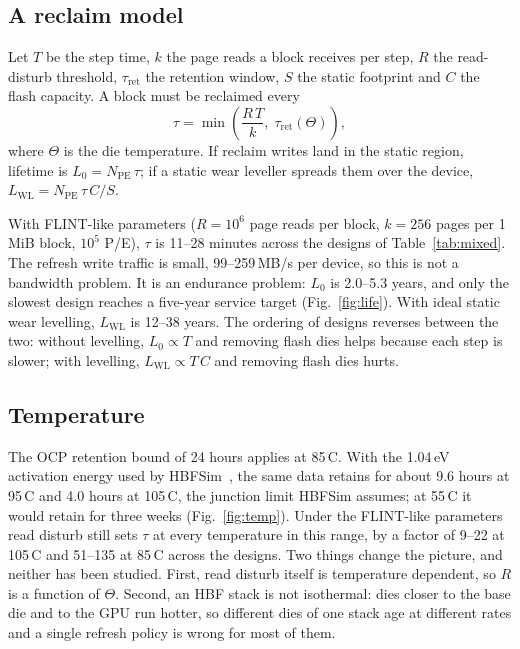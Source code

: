 \documentclass[conference,10pt]{IEEEtran}
\begin{document}
\subsection{A reclaim model}
Let $T$ be the step time, $k$ the page reads a block receives per step, $R$ the
read-disturb threshold, $\tau_{\mathrm{ret}}$ the retention window, $S$ the
static footprint and $C$ the flash capacity. A block must be reclaimed every
\begin{equation}
\tau = \min\!\left(\frac{R\,T}{k},\; \tau_{\mathrm{ret}}(\Theta)\right),
\label{eq:tau}
\end{equation}
where $\Theta$ is the die temperature. If reclaim writes land in the static
region, lifetime is $L_{0}=N_{\mathrm{PE}}\,\tau$; if a static wear leveller
spreads them over the device, $L_{\mathrm{WL}}=N_{\mathrm{PE}}\,\tau\,C/S$.

With FLINT-like parameters ($R=10^{6}$ page reads per block, $k=256$ pages per
1\,MiB block, $10^{5}$ P/E), $\tau$ is 11--28 minutes across the designs of
Table~\ref{tab:mixed}. The refresh write traffic is small, 99--259\,MB/s per
device, so this is not a bandwidth problem. It is an endurance problem:
$L_{0}$ is 2.0--5.3 years, and only the slowest design reaches a five-year
service target (Fig.~\ref{fig:life}). With ideal static wear levelling,
$L_{\mathrm{WL}}$ is 12--38 years. The ordering of designs reverses between the
two: without levelling, $L_{0}\propto T$ and removing flash dies helps because
each step is slower; with levelling, $L_{\mathrm{WL}}\propto T\,C$ and removing
flash dies hurts.

\subsection{Temperature}
The OCP retention bound of 24 hours applies at 85\,\textdegree{}C. With the 1.04\,eV
activation energy used by HBFSim~\cite{hu2026hbfsim,luo2018heatwatch}, the same
data retains for about 9.6 hours at 95\,\textdegree{}C and 4.0 hours at 105\,\textdegree{}C, the
junction limit HBFSim assumes; at 55\,\textdegree{}C it would retain for three weeks
(Fig.~\ref{fig:temp}). Under the FLINT-like parameters read disturb still sets
$\tau$ at every temperature in this range, by a factor of 9--22 at 105\,\textdegree{}C and
51--135 at 85\,\textdegree{}C across the designs. Two things change the picture, and neither has been
studied. First, read disturb itself is temperature dependent, so $R$ is a
function of $\Theta$. Second, an HBF stack is not isothermal: dies closer to the
base die and to the GPU run hotter, so different dies of one stack age at
different rates and a single refresh policy is wrong for most of them.
\end{document}
